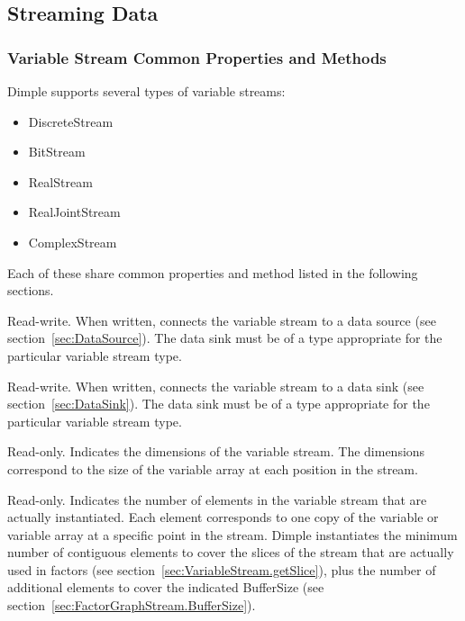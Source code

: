 \subsection{Streaming Data}

\subsubsection{Variable Stream Common Properties and Methods}

Dimple supports several types of variable streams:

\begin{itemize}
\item DiscreteStream
\item BitStream
\item RealStream
\item RealJointStream
\item ComplexStream
\end{itemize}

Each of these share common properties and method listed in the following sections.



Read-write.  When written, connects the variable stream to a data source (see section~\ref{sec:DataSource}).  The data sink must be of a type appropriate for the particular variable stream type.


Read-write.  When written, connects the variable stream to a data sink (see section~\ref{sec:DataSink}).  The data sink must be of a type appropriate for the particular variable stream type.

\ifmatlab
{}

Read-only.  Indicates the dimensions of the variable stream.  The dimensions correspond to the size of the variable array at each position in the stream.
\fi


Read-only.  Indicates the number of elements in the variable stream that are actually instantiated.  Each element corresponds to one copy of the variable or variable array at a specific point in the stream.  Dimple instantiates the minimum number of contiguous elements to cover the slices of the stream that are actually used in factors (see section~\ref{sec:VariableStream.getSlice}), plus the number of additional elements to cover the indicated BufferSize (see section~\ref{sec:FactorGraphStream.BufferSize}).

